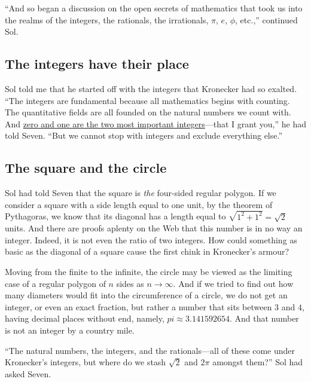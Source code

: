 \documentclass[
  a4paper,
]{article}
\begin{document}
``And so began a discussion on the open secrets of mathematics that took
us into the realms of the integers, the rationals, the irrationals,
\(\pi\), \(e\), \(\phi\), etc.,'' continued Sol.

\hypertarget{the-integers-have-their-place}{%
\subsection{The integers have their
place}\label{the-integers-have-their-place}}

Sol told me that he started off with the integers that Kronecker had so
exalted. ``The integers are fundamental because all mathematics begins
with counting. The quantitative fields are all founded on the natural
numbers we count with. And
\href{https://swanlotus.netlify.app/blogs/the-two-most-important-numbers-zero-and-one}{zero
and one are the two most important integers}---that I grant you,'' he
had told Seven. ``But we cannot stop with integers and exclude
everything else.''

\hypertarget{the-square-and-the-circle}{%
\subsection{The square and the circle}\label{the-square-and-the-circle}}

Sol had told Seven that the square is \emph{the} four-sided regular
polygon. If we consider a square with a side length equal to one unit,
by the theorem of Pythagoras, we know that its diagonal has a length
equal to \(\sqrt{1^2 + 1^2} = \sqrt{2}\) units. And there are proofs
aplenty on the Web that this number is in no way an integer. Indeed, it
is not even the ratio of two integers. How could something as basic as
the diagonal of a square cause the first chink in Kronecker's armour?

Moving from the finite to the infinite, the circle may be viewed as the
limiting case of a regular polygon of \(n\) sides as \(n \to \infty\).
And if we tried to find out how many diameters would fit into the
circumference of a circle, we do not get an integer, or even an exact
fraction, but rather a number that sits between \(3\) and \(4\), having
decimal places without end, namely, \(pi \approx 3.141592654\). And that
number is not an integer by a country mile.

``The natural numbers, the integers, and the rationals---all of these
come under Kronecker's integers, but where do we stash \(\sqrt{2}\) and
\(2\pi\) amongst them?'' Sol had asked Seven.
\end{document}
